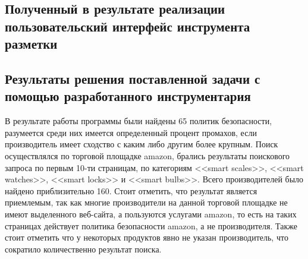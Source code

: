 \documentclass[../main]{subfiles}
\begin{document}
\subsection{Полученный в результате реализации пользовательский интерфейс инструмента разметки}

\subsection{Результаты решения поставленной задачи с помощью разработанного инструментария}
В результате работы программы были найдены 65 политик безопасности, разумеется среди них имеется определенный процент промахов, если производитель имеет сходство с каким либо другим более крупным. Поиск осуществлялся по торговой площадке amazon, брались результаты поискового запроса по первым 10-ти страницам, по категориям <<smart scales>>, <<smart watches>>, <<smart locks>> и <<smart bulbs>>. Всего производителей было найдено приблизительно 160. Стоит отметить, что результат является приемлемым, так как многие производители на данной торговой площадке не имеют выделенного веб-сайта, а пользуются услугами amazon, то есть на таких страницах действует политика безопасности amazon, а не производителя. Также стоит отметить что у некоторых продуктов явно не указан производитель, что сократило количественно результат поиска.
\end{document}
